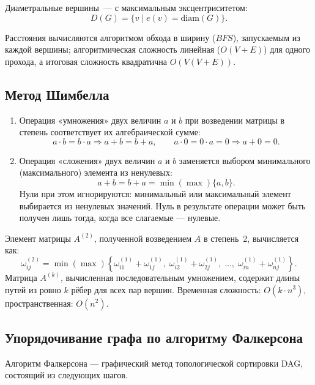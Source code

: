 Диаметральные вершины~--- с максимальным эксцентриситетом:
\[
D(G) = \{v \mid e(v) = \mathrm{diam}(G)\}.
\]

Расстояния вычисляются алгоритмом обхода в ширину ($BFS$), запускаемым
из каждой вершины; алгоритмическая сложность линейная ($O(V + E)$) для
одного прохода, а итоговая сложность квадратична $O(V(V + E))$.

\subsection{Метод Шимбелла}

\begin{enumerate}
    \item Операция «умножения» двух величин $a$ и $b$ при возведении матрицы
    в степень соответствует их алгебраической сумме:
    \begin{equation}
        a \cdot b = b \cdot a \Rightarrow a + b = b + a, \qquad
        a \cdot 0 = 0 \cdot a = 0 \Rightarrow a + 0 = 0.
    \end{equation}

    \item Операция «сложения» двух величин $a$ и $b$ заменяется выбором
    минимального (максимального) элемента из ненулевых:
    \begin{equation}
        a + b = b + a = \min(\max)\{a, b\}.
    \end{equation}
    Нули при этом игнорируются: минимальный или максимальный элемент
    выбирается из ненулевых значений. Нуль в результате операции может быть
    получен лишь тогда, когда все слагаемые --- нулевые.
\end{enumerate}

Элемент матрицы $A^{(2)}$, полученной возведением $A$ в степень~2,
вычисляется как:
\[
\omega_{ij}^{(2)} = \min(\max) \left\{
    \omega_{i1}^{(1)} + \omega_{1j}^{(1)},\;
    \omega_{i2}^{(1)} + \omega_{2j}^{(1)},\;
    \ldots,\;
    \omega_{in}^{(1)} + \omega_{nj}^{(1)}
\right\}.
\]
Матрица $A^{(k)}$, вычисленная последовательным умножением, содержит длины
путей из ровно $k$ рёбер для всех пар вершин. Временная сложность: $O(k \cdot n^3)$,
пространственная: $O(n^2)$.

\subsection{Упорядочивание графа по алгоритму Фалкерсона}

Алгоритм Фалкерсона --- графический метод топологической сортировки DAG,
состоящий из следующих шагов.

